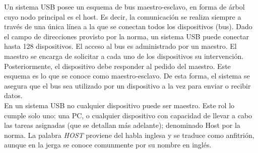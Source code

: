 Un sistema USB posee un esquema de bus maestro-esclavo, en forma de árbol cuyo nodo principal es el host. Es decir, la comunicación se realiza siempre a través de una única línea a la que se conectan todos los dispositivos (bus). Dado el campo de direcciones provisto por la norma, un sistema USB puede conectar hasta 128 dispositivos. El acceso al bus es administrado por un maestro. El maestro se encarga de solicitar a cada uno de los dispositivos su intervención. Posteriormente, el dispositivo debe responder al pedido del maestro. Este esquema es lo que se conoce como maestro-esclavo. De esta forma, el sistema se asegura que el bus sea utilizado por un dispositivo a la vez para enviar o recibir datos.\\

En un sistema USB no cualquier dispositivo puede ser maestro. Este rol lo cumple solo uno: una PC, o cualquier dispositivo con capacidad de llevar a cabo las tareas asignadas (que se detallan más adelante); denominado Host por la norma. La palabra {\it HOST} proviene del habla inglesa y se traduce como anfitrión, aunque en la jerga se conoce comunmente por su nombre en inglés.\\

